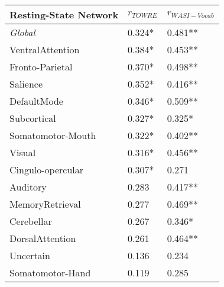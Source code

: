 \begin{tabular}{L{5cm}L{2cm}L{2cm}}
\toprule
Resting-State Network & $r_{TOWRE}$ & $r_{WASI-Vocab}$ \\
\midrule
\textit{Global}           &  0.324* & 0.481** \\
VentralAttention  &        0.384* &       0.453** \\
Fronto-Parietal   &        0.370* &       0.498** \\
Salience          &        0.352* &       0.416** \\
DefaultMode       &        0.346* &       0.509** \\
Subcortical       &        0.327* &       0.325*  \\
Somatomotor-Mouth &        0.322* &       0.402** \\
Visual            &        0.316* &       0.456** \\
Cingulo-opercular &        0.307* &       0.271   \\
Auditory          &        0.283 &       0.417**  \\
MemoryRetrieval   &        0.277 &       0.469**  \\
Cerebellar        &        0.267 &       0.346*   \\
DorsalAttention   &        0.261 &       0.464**  \\
Uncertain         &        0.136 &       0.234    \\
Somatomotor-Hand  &        0.119 &       0.285    \\
\bottomrule
\end{tabular}